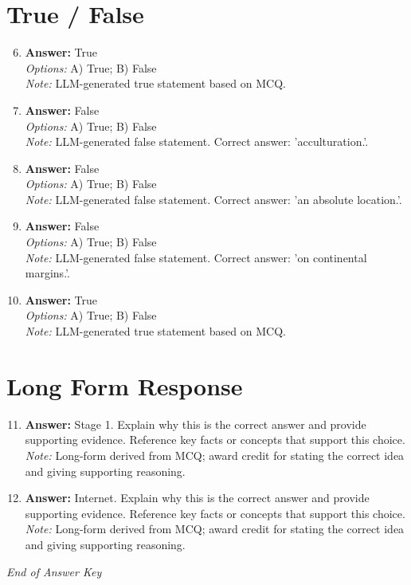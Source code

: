 \documentclass[12pt]{article}
\begin{document}
\section*{True / False}
\begin{enumerate}[label=\arabic*.]
\setcounter{enumi}{5}
\item \textbf{Answer:} True
\\ \textit{Options:} A) True; B) False
\\ \textit{Note:} LLM-generated true statement based on MCQ.
\item \textbf{Answer:} False
\\ \textit{Options:} A) True; B) False
\\ \textit{Note:} LLM-generated false statement. Correct answer: 'acculturation.'.
\item \textbf{Answer:} False
\\ \textit{Options:} A) True; B) False
\\ \textit{Note:} LLM-generated false statement. Correct answer: 'an absolute location.'.
\item \textbf{Answer:} False
\\ \textit{Options:} A) True; B) False
\\ \textit{Note:} LLM-generated false statement. Correct answer: 'on continental margins.'.
\item \textbf{Answer:} True
\\ \textit{Options:} A) True; B) False
\\ \textit{Note:} LLM-generated true statement based on MCQ.
\end{enumerate}

\section*{Long Form Response}
\begin{enumerate}[label=\arabic*.]
\setcounter{enumi}{10}
\item \textbf{Answer:} Stage 1. Explain why this is the correct answer and provide supporting evidence. Reference key facts or concepts that support this choice.
\\ \textit{Note:} Long-form derived from MCQ; award credit for stating the correct idea and giving supporting reasoning.
\item \textbf{Answer:} Internet. Explain why this is the correct answer and provide supporting evidence. Reference key facts or concepts that support this choice.
\\ \textit{Note:} Long-form derived from MCQ; award credit for stating the correct idea and giving supporting reasoning.
\end{enumerate}

\vfill
\noindent\textit{End of Answer Key}
\end{document}

